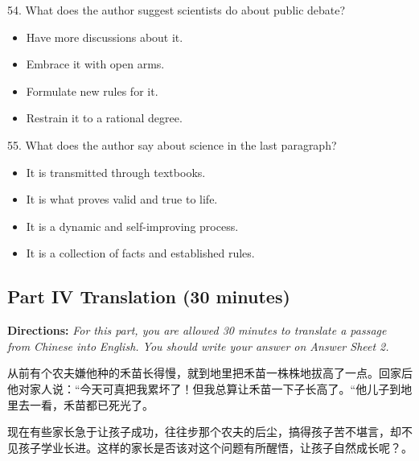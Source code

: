 \documentclass[UTF8,11pt]{ctexart}
\begin{document}
54. What does the author suggest scientists do about public debate?


\begin{itemize}[leftmargin=2em,itemsep=.2em,topsep=.4em]\item[A.] Have more discussions about it.
\item[B.] Embrace it with open arms.
\item[C.] Formulate new rules for it.
\item[D.] Restrain it to a rational degree.
\end{itemize}

55. What does the author say about science in the last paragraph?


\begin{itemize}[leftmargin=2em,itemsep=.2em,topsep=.4em]\item[A.] It is transmitted through textbooks.
\item[B.] It is what proves valid and true to life.
\item[C.] It is a dynamic and self-improving process.
\item[D.] It is a collection of facts and established rules.
\end{itemize}

\subsection*{\textbf{Part IV} \textbf{Translation} \textbf{(30 minutes)}}


\textbf{Directions: }\textit{For this part, you are allowed 30 minutes to translate a passage from Chinese into} \textit{English. You should write your answer on Answer Sheet 2.}


从前有个农夫嫌他种的禾苗长得慢，就到地里把禾苗一株株地拔高了一点。回家后他对家人说：“今天可真把我累坏了！但我总算让禾苗一下子长高了。“他儿子到地里去一看，禾苗都已死光了。


现在有些家长急于让孩子成功，往往步那个农夫的后尘，搞得孩子苦不堪言，却不见孩子学业长进。这样的家长是否该对这个问题有所醒悟，让孩子自然成长呢？。
\end{document}
